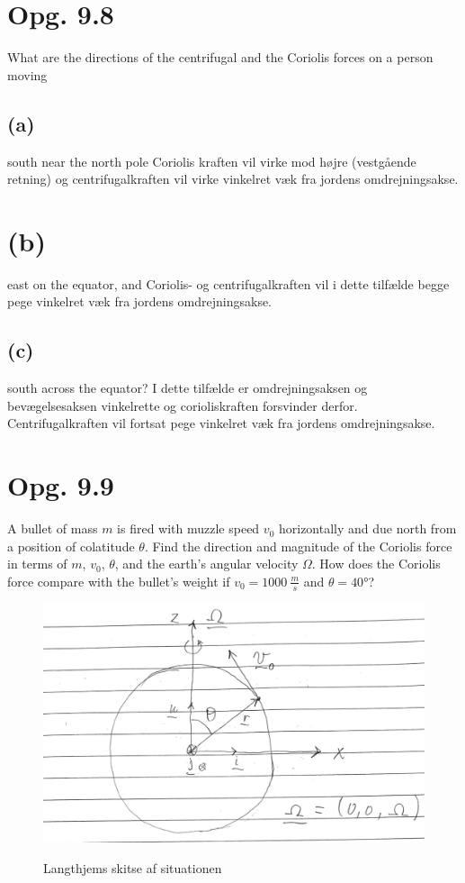 \documentclass[12pt]{article}
\theoremstyle{definition}
\begin{document}
\section*{Opg. 9.8}
What are the directions of the centrifugal and the Coriolis forces on a person moving

\subsection*{(a)}
south near the north pole
\bigbreak
Coriolis kraften vil virke mod højre (vestgående retning) og centrifugalkraften vil virke vinkelret væk fra jordens omdrejningsakse.

\section*{(b)}
east on the equator, and
\bigbreak
Coriolis- og centrifugalkraften vil i dette tilfælde begge pege vinkelret væk fra jordens omdrejningsakse.

\subsection*{(c)}
south across the equator?
\bigbreak
I dette tilfælde er omdrejningsaksen og bevægelsesaksen vinkelrette og corioliskraften forsvinder derfor. Centrifugalkraften vil fortsat pege vinkelret væk fra jordens omdrejningsakse.

\section*{Opg. 9.9}
A bullet of mass $m$ is fired with muzzle speed $v_0$ horizontally and due north from a position of colatitude $\theta$. Find the direction and magnitude of the Coriolis force in terms of $m$, $v_0$, $\theta$, and the earth's angular velocity $\Omega$. How does the Coriolis force compare with the bullet's weight if $v_0 = \qty{1000}{\frac{m}{s}}$ and $\theta = \ang{40}$?
\bigbreak

\begin{figure} [ht]
  \centering
  \caption{Langthjems skitse af situationen}
  \includegraphics[width=0.8\linewidth]{../figures/F17_9_9.png}
  \label{fig:F17_9_9}
\end{figure}
\end{document}
